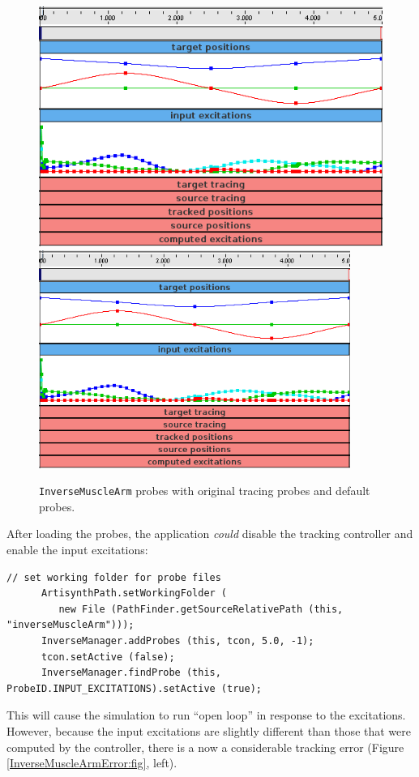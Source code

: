 \begin{figure}[ht]
\begin{center}
\iflatexml
   \includegraphics[]{images/InverseMuscleArmProbes}
\else
   \includegraphics[width=4in]{images/InverseMuscleArmProbes}
\fi
\end{center}
\caption{{\tt InverseMuscleArm} probes with original tracing
probes and default probes.}
\label{InverseMuscleArmProbes:fig}
\end{figure}

After loading the probes, the application {\it could} disable the tracking
controller and enable the input excitations:
%
\begin{lstlisting}[]
      // set working folder for probe files
      ArtisynthPath.setWorkingFolder (
         new File (PathFinder.getSourceRelativePath (this, "inverseMuscleArm")));
      InverseManager.addProbes (this, tcon, 5.0, -1);
      tcon.setActive (false);
      InverseManager.findProbe (this, ProbeID.INPUT_EXCITATIONS).setActive (true);
\end{lstlisting}
%
This will cause the simulation to run ``open loop'' in response to the
excitations. However, because the input excitations are slightly different than
those that were computed by the controller, there is a now a considerable
tracking error (Figure \ref{InverseMuscleArmError:fig}, left). 

